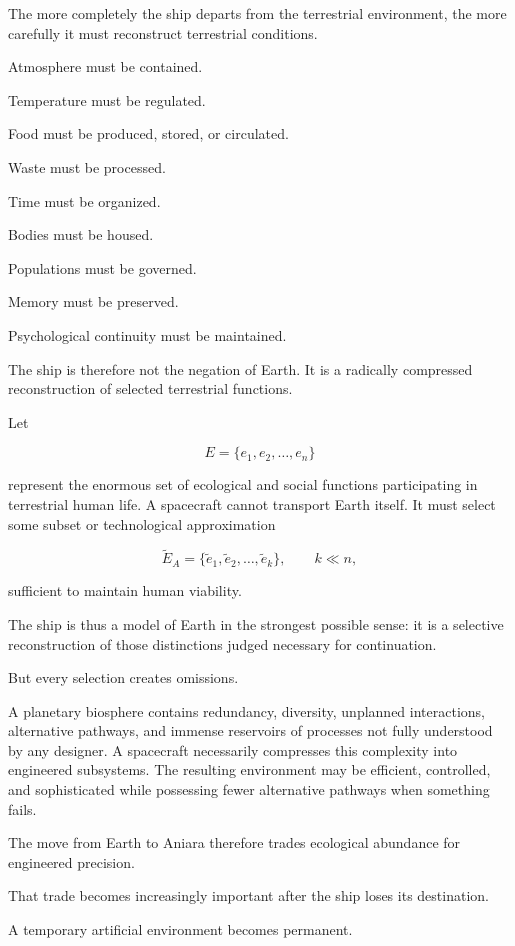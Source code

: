 \documentclass[11pt,oneside]{book}
\theoremstyle{definition}
\theoremstyle{remark}
\begin{document}
The more completely the ship departs from the terrestrial environment, the more carefully it must reconstruct terrestrial conditions.

Atmosphere must be contained.

Temperature must be regulated.

Food must be produced, stored, or circulated.

Waste must be processed.

Time must be organized.

Bodies must be housed.

Populations must be governed.

Memory must be preserved.

Psychological continuity must be maintained.

The ship is therefore not the negation of Earth. It is a radically compressed reconstruction of selected terrestrial functions.

Let

\[
E
=
\{e_1,e_2,\ldots,e_n\}
\]

represent the enormous set of ecological and social functions participating in terrestrial human life. A spacecraft cannot transport Earth itself. It must select some subset or technological approximation

\[
\widetilde E_A
=
\{\tilde e_1,\tilde e_2,\ldots,\tilde e_k\},
\qquad
k\ll n,
\]

sufficient to maintain human viability.

The ship is thus a model of Earth in the strongest possible sense: it is a selective reconstruction of those distinctions judged necessary for continuation.

But every selection creates omissions.

A planetary biosphere contains redundancy, diversity, unplanned interactions, alternative pathways, and immense reservoirs of processes not fully understood by any designer. A spacecraft necessarily compresses this complexity into engineered subsystems. The resulting environment may be efficient, controlled, and sophisticated while possessing fewer alternative pathways when something fails.

The move from Earth to Aniara therefore trades ecological abundance for engineered precision.

That trade becomes increasingly important after the ship loses its destination.

A temporary artificial environment becomes permanent.
\end{document}
